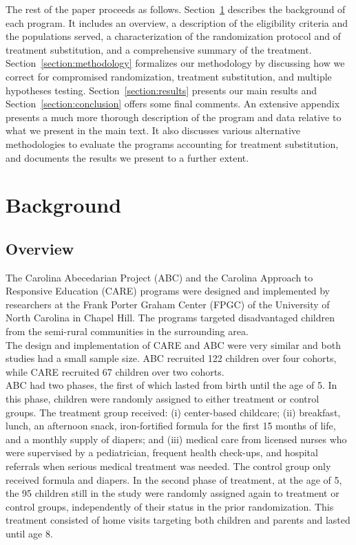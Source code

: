 \noindent The rest of the paper proceeds as follows. Section~\ref{section:background} describes the background of each program. It includes an overview, a description of the eligibility criteria and the populations served, a characterization of the randomization protocol and of treatment substitution, and a comprehensive summary of the treatment.  Section~\ref{section:methodology} formalizes our methodology by discussing how we correct for compromised randomization, treatment substitution, and multiple hypotheses testing. Section~\ref{section:results} presents our main results and Section~\ref{section:conclusion} offers some final comments. An extensive appendix presents a much more thorough description of the program and data relative to what we present in the main text. It also discusses various alternative methodologies to evaluate the programs accounting for treatment substitution, and documents the results we present to a further extent.

\section{Background} \label{section:background}
\subsection{Overview}

\noindent The Carolina Abecedarian Project (ABC) and the Carolina Approach to Responsive Education (CARE) programs were designed and implemented by researchers at the Frank Porter Graham Center (FPGC) of the University of North Carolina in Chapel Hill. The programs targeted disadvantaged children from the semi-rural communities in the surrounding area.\\

\noindent The design and implementation of CARE and ABC were very similar and both studies had a small sample size. ABC recruited 122 children over four cohorts, while CARE recruited 67 children over two cohorts.\\  

\noindent ABC had two phases, the first of which lasted from birth until the age of 5. In this phase, children were randomly assigned to either treatment or control groups. The treatment group received: (i) center-based childcare; (ii) breakfast, lunch, an afternoon snack, iron-fortified formula for the first 15 months of life, and a monthly supply of diapers; and (iii) medical care from licensed nurses who were supervised by a pediatrician, frequent health check-ups, and hospital referrals when serious medical treatment was needed. The control group only received formula and diapers. In the second phase of treatment, at the age of 5, the 95 children still in the study were randomly assigned again to treatment or control groups, independently of their status in the prior randomization. This treatment consisted of home visits targeting both children and parents and lasted until age 8.\\ 

